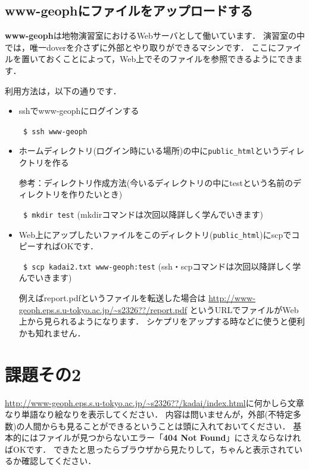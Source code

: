 \documentclass{jarticle}
\begin{document}
\subsection{www-geophにファイルをアップロードする}
{\bf www-geoph}は地物演習室におけるWebサーバとして働いています．
演習室の中では，唯一doverを介さずに外部とやり取りができるマシンです．
ここにファイルを置いておくことによって，Web上でそのファイルを参照できるようにできます．

利用方法は，以下の通りです．
\begin{itemize}
\item sshでwww-geophにログインする

\verb| $ ssh www-geoph| 

\item ホームディレクトリ(ログイン時にいる場所)の中に\verb|public_html|というディレクトリを作る

参考：ディレクトリ作成方法(今いるディレクトリの中にtestという名前のディレクトリを作りたいとき)

\verb| $ mkdir test| (mkdirコマンドは次回以降詳しく学んでいきます)

\item Web上にアップしたいファイルをこのディレクトリ(\verb|public_html|)にscpでコピーすればOKです．

\verb| $ scp kadai2.txt www-geoph:test| (ssh・scpコマンドは次回以降詳しく学んでいきます)

例えばreport.pdfというファイルを転送した場合は
\url{http://www-geoph.eps.s.u-tokyo.ac.jp/~s2326??/report.pdf}
というURLでファイルがWeb上から見られるようになります．
シケプリをアップする時などに使うと便利かも知れません．
\end{itemize}

\section{課題その2}
\url{http://www-geoph.eps.s.u-tokyo.ac.jp/~s2326??/kadai/index.html}に何かしら文章なり単語なり絵なりを表示してください．
内容は問いませんが，外部(不特定多数)の人間からも見ることができるということは頭に入れておいてください．
基本的にはファイルが見つからないエラー「{\bf 404 Not Found}」にさえならなければOKです．
できたと思ったらブラウザから見たりして，ちゃんと表示されているか確認してください．

\vspace{1em}
\end{document}
